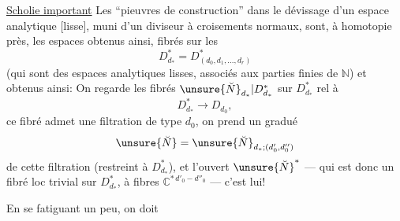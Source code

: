 
\uline{Scholie important} Les ``pieuvres de construction'' dans le dévissage d'un espace analytique [lisse], muni d'un diviseur à croisements normaux, sont,  à homotopie près, les espaces obtenus ainsi, fibrés sur les
\[
D_{d_*}^{*}=D_{(d_0,d_1,\ldots,d_r)}^{*}
\]
(qui sont des espaces analytiques lisses,  associés aux parties finies  de $\mathbb N$) et obtenus ainsi: On regarde les fibrés  $\unsure{\breve N}_{d_*}|D_{d_*}^{*}$ sur $D_{d_*}^{*}$ rel à
\[
D_{d_*}^{*}\longrightarrow D_{d_0},
\]
ce fibré  admet une filtration de type $d_0$, on prend un  gradué
\[
\unsure{\breve N}=\unsure{\breve N}_{d_*;(d'_0,d''_0)}
\]
de cette filtration  (restreint à $D_{d_*}^{*}$), et l'ouvert $\unsure{\breve N}^{*}$ --- qui est donc un fibré loc trivial sur $D_{d_*}^{*}$, à fibres $\mathbb C^{*\,d'_0-d''_0}$ --- c'est lui!


En se fatiguant un peu, on doit

